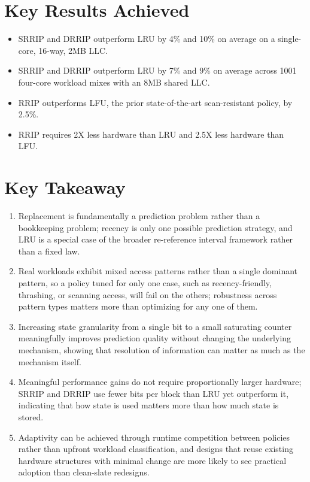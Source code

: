 \documentclass[10pt, conference]{IEEEtran}
\begin{document}
\section{Key Results Achieved}

\begin{itemize}[leftmargin=*, itemsep=0pt, topsep=1pt, parsep=0pt]
    \item SRRIP and DRRIP outperform LRU by 4\% and 10\% on average on a single-core, 16-way, 2MB LLC.
    \item SRRIP and DRRIP outperform LRU by 7\% and 9\% on average across 1001 four-core workload mixes with an 8MB shared LLC.
    \item RRIP outperforms LFU, the prior state-of-the-art scan-resistant policy, by 2.5\%.
    \item RRIP requires 2X less hardware than LRU and 2.5X less hardware than LFU.
\end{itemize}

\section{Key Takeaway}

\begin{enumerate}[leftmargin=*, itemsep=0pt, topsep=1pt, parsep=0pt]
    \item Replacement is fundamentally a prediction problem rather than a bookkeeping problem; recency is only one possible prediction strategy, and LRU is a special case of the broader re-reference interval framework rather than a fixed law.
    \item Real workloads exhibit mixed access patterns rather than a single dominant pattern, so a policy tuned for only one case, such as recency-friendly, thrashing, or scanning access, will fail on the others; robustness across pattern types matters more than optimizing for any one of them.
    \item Increasing state granularity from a single bit to a small saturating counter meaningfully improves prediction quality without changing the underlying mechanism, showing that resolution of information can matter as much as the mechanism itself.
    \item Meaningful performance gains do not require proportionally larger hardware; SRRIP and DRRIP use fewer bits per block than LRU yet outperform it, indicating that how state is used matters more than how much state is stored.
    \item Adaptivity can be achieved through runtime competition between policies rather than upfront workload classification, and designs that reuse existing hardware structures with minimal change are more likely to see practical adoption than clean-slate redesigns.
\end{enumerate}
\end{document}
